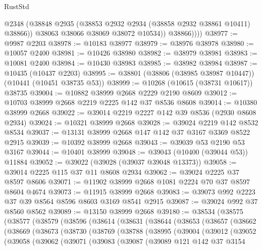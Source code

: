 \begin{lexlean}{RustStd}
\begin{coremodule}
                @2348
                (@38848 @2935 (@38853 @2932 @2934 (@38858 @2932 @38861 @10411) @38866))
                @38063
                @38066
                @38069
                @38072
                @10534))
            @38866))))
@38977 := @9987 @2203
@38978 := @10183 @38977
@38979 := @38976 @38978
@38980 := @10057 @2400
@38981 := @10426 @38980
@38982 := @38979 @38981
@38983 := @10081 @2400
@38984 := @10430 @38983
@38985 := @38982 @38984
@38987 := @10435 (@10437 @2203)
@38995 := @38801 (@38806 (@38985 @38987 @10447)) (@10441 (@10451 @38735 @53))
@38999 := @10268 (@10615 (@38731 @10617)) @38735
@39004 := @10882 @38999 @2668 @2229 @2190 @8609
@39012 := @10703 @38999 @2668 @2219 @2225 @142 @37 @8536 @8608
@39014 := @10380 @38999 @2668
@39022 := @39014 @2219 @2227 @142 @39 @8536 (@2930 @8608 @2934)
@39024 := @10321 @38999 @2668
@39028 := @39024 @2219 @142 @8532 @8534
@39037 := @13131 @38999 @2668 @147 @142 @37 @3167 @3369 @8522 @2915
@39039 := @10392 @38999 @2668
@39043 := @39039 @53 @2190 @53 @3167
@39044 := @10401 @38999
@39048 := @39043 (@10400 (@39044 @53)) @11884
@39052 := @39022 (@39028 (@39037 @39048 @13373))
@39058 := @39014 @2225 @115 @37 @11 @8608 @2934
@39062 := @39024 @2225 @37 @8597 @8606
@39071 := @11902 @38999 @2668 @1081 @2224 @70 @37 @8597 @8604 @4674
@39073 := @11915 @38999 @2668
@39083 := @39073 @992 @2223 @37 @39 @8564 @8596 @8603 @3169 @8541 @2915
@39087 := @39024 @992 @37 @8560 @8562
@39089 := @13150 @38999 @2668
@39180 := @38534
    (@38575
      (@38577
        (@38579
          (@38596
            (@38614
              (@38631
                (@38644
                  (@38653
                    (@38657
                      (@38662
                        (@38669
                          (@38673
                            (@38730
                              (@38769
                                (@38788
                                  (@38995
                                    (@39004
                                      (@39012
                                        (@39052
                                          (@39058
                                            (@39062
                                              (@39071
                                                (@39083
                                                  (@39087
                                                    (@39089
                                                      @121
                                                      @142
                                                      @37
                                                      @3154

\end{coremodule}
\end{lexlean}
